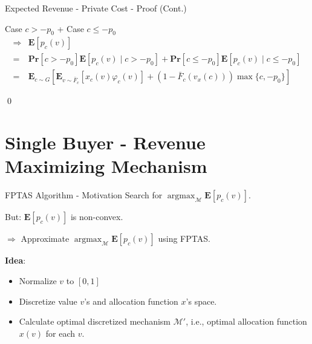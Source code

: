 \documentclass{beamer}
\begin{document}
\begin{frame}{Expected Revenue - Private Cost - Proof (Cont.)}

  Case $c > -p_0$ + Case $c \leq -p_0$
  \begin{align*}
    \Rightarrow & \mathbf{E}\left[p_c(v)\right]                                                                                                             \\
    =           & \mathbf{Pr}[c > -p_0]\mathbf{E}\left[p_c(v) \mid c > -p_0\right] + \mathbf{Pr}[c \leq -p_0]\mathbf{E}\left[p_c(v) \mid c \leq -p_0\right] \\
    =           & \mathbf{E}_{c \sim G}\left[\mathbf{E}_{v \sim \bar{F}_c}\left[x_c(v)\varphi_c(v)\right] + (1-\bar{F}_c(v_x(c))) \max\{c, -p_0\}\right]
  \end{align*}

  \qed
\end{frame}

\section{Single Buyer - Revenue Maximizing Mechanism}

\begin{frame}{FPTAS Algorithm - Motivation}
  Search for $\operatorname{argmax}_{\mathcal{M}} \mathbf{E}\left[p_c(v)\right]$.

  But: $\mathbf{E}\left[p_c(v)\right]$ is non-convex.

  $\Rightarrow$ Approximate $\operatorname{argmax}_{\mathcal{M}} \mathbf{E}\left[p_c(v)\right]$ using FPTAS.

  \textbf{Idea}:
  \begin{itemize}
    \item Normalize $v$ to $[0,1]$
    \item Discretize value $v$'s and allocation function $x$'s space.
    \item Calculate optimal discretized mechanism $\mathcal{M}'$, i.e., optimal allocation function $x(v)$ for each $v$.
  \end{itemize}

\end{frame}
\end{document}

